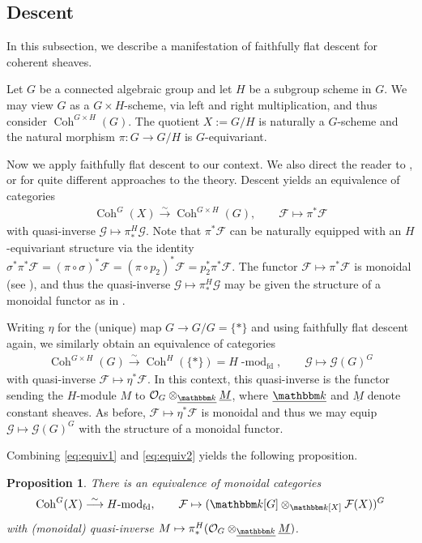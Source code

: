 \documentclass[twoside,12pt,reqno]{amsart}
\newtheorem{Proposition}[Theorem]{Proposition}
\theoremstyle{remark}
\numberwithin{equation}{section}
\def\isoto{\overset{\sim}{\longrightarrow}}
\def\k{{\mathbbm k}}
\def\lmod{\!\operatorname{-mod}}
\def\Coh{\operatorname{Coh}}
\def\cF{\mathcal{F}}
\def\cG{\mathcal{G}}
\def\Oc{\mathcal{O}}
\newcommand{\fd}{\operatorname{fd}}
\begin{document}
\subsection{Descent}\label{ss:descent}
In this subsection, we describe a manifestation of faithfully flat descent for coherent sheaves.

Let $G$ be a connected algebraic group and let $H$ be a subgroup scheme in $G$. We may view $G$ as a $G\times H$-scheme, via left and right multiplication, and thus consider $\Coh^{G\times H}(G)$. The quotient $X:=G/H$ is naturally a $G$-scheme \cite[I.5.6(8)]{JanRAGS} and the natural morphism $\pi:G\to G/H$ is $G$-equivariant.

Now we apply faithfully flat descent \cite[Expos\'{e} VIII, Corollaire 1.3]{SGA} to our context. We also direct the reader to \cite[Lemma 2.3]{Br}, \cite[Theorem 4.2.14]{HL} or \cite[Theorem~2.7]{CPS} for quite different approaches to the theory. Descent yields an equivalence of categories
\begin{eqnarray}
\label{eq:equiv1}
\Coh^G(X)\isoto \Coh^{G\times H}(G), \qquad \cF\mapsto \pi^*\cF    
\end{eqnarray}
with quasi-inverse $\cG\mapsto \pi_*^H\cG$. Note that $\pi^*\cF$ can be naturally equipped with an $H$-equivariant structure via the identity $\sigma^*\pi^*\cF=(\pi\circ\sigma)^*\cF=(\pi\circ p_2)^*\cF=p_2^*\pi^*\cF$. The functor $\cF\mapsto \pi^*\cF$ is monoidal (see \cite[Lemma 1.17.16.4]{St}), and thus the quasi-inverse $\cG\mapsto \pi_*^H\cG$ may be given the structure of a monoidal functor as in \cite[Remark 2.4.10]{EGNO}.

Writing $\eta$ for the (unique) map $G\to G/G=\{\ast\}$ and using faithfully flat descent again, we similarly obtain an equivalence of categories
\begin{eqnarray}
\label{eq:equiv2}
    \Coh^{G\times H}(G)\isoto \Coh^{H}(\{\ast\})=H\lmod_{\fd}, \qquad \cG\mapsto \cG(G)^G
\end{eqnarray}
with quasi-inverse $\cF\mapsto \eta^*\cF$. In this context, this quasi-inverse is the functor sending the $H$-module $M$ to $\Oc_G\otimes_{\underline{\k}}\underline{M}$, where $\underline{\k}$ and $\underline{M}$ denote constant sheaves. As before, $\cF\mapsto \eta^*\cF$ is monoidal and thus we may equip $\cG\mapsto \cG(G)^G$ with the structure of a monoidal functor.

Combining \eqref{eq:equiv1} and \eqref{eq:equiv2} yields the following proposition.
\begin{Proposition}\label{p:Qcoh=Hmod}
There is an equivalence of monoidal categories \begin{equation}\label{eq:qc=Hmod}
\Coh^G(X)\isoto H\lmod_{\fd}, \qquad \cF\mapsto (\k[G]\otimes_{\k[X]}\cF(X))^G
\end{equation} with (monoidal) quasi-inverse $M\mapsto \pi_*^H(\Oc_G\otimes_{\underline{\k}}\underline{M})$. 
\end{Proposition}
\end{document}
